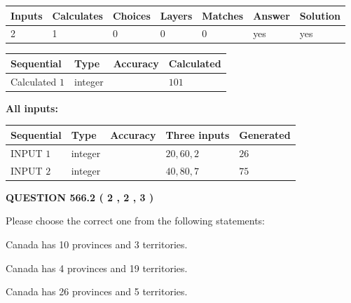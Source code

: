 \documentclass[12pt]{article}
\begin{document}
   
\noindent\begin{tabular}{|l|l|l|l|l|l|l|}
 \hline
Inputs & Calculates & Choices & Layers & Matches & Answer & Solution \\ \hline
 2  & 
 1  & 
 0
  & 
 0  & 
 0  & 
  yes & 
  yes 
  \\ \hline
 \end{tabular}
   
   
   
   
\noindent{}
   
   
  
  
\noindent\begin{tabular}{|l|l|l|l|}
\hline
 Sequential & Type & Accuracy & Calculated \\ 
\hline
 
 
  Calculated $  1 $ & integer &  & 
  $ 101 $ 
 \\  \hline  
 \end{tabular}
   
   
   
   
\noindent\vspace{0.1in}\hspace{-0.08in} {\textbf{\Large{All inputs: }}}
   
   
  
  
\noindent\begin{tabular}{|l|l|l|l|l|}
\hline
 Sequential & Type & Accuracy & Three inputs & Generated \\ 
\hline
 
 
  INPUT $  1 $ & integer &  & $
 20
 , 
 60
 , 
 2
 $ & $ 26 $ 
 \\  \hline  
 
 
  INPUT $  2 $ & integer &  & $
 40
 , 
 80
 , 
 7
 $ & $ 75 $ 
 \\  \hline  
 \end{tabular}
   
   
  
\vspace{0.2in}
  
{\textbf{\Large{QUESTION
566.2 
 ( 2 , 2 , 3 )
}}}
  
  
Please choose the correct one from the following statements:
 
 
Canada has 10  provinces and 3 territories.
 
 
Canada has   4 provinces and  19 territories.
 
 
Canada has  26 provinces and  5 territories.
 
\end{document}
